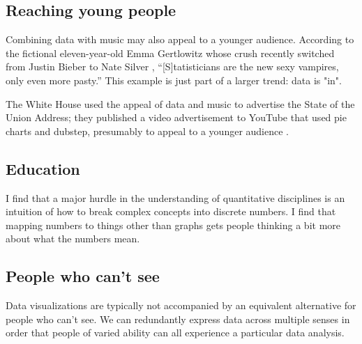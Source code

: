\documentclass{acm_proc_article-sp}
\begin{document}
\subsection{Reaching young people}
Combining data with music may also appeal to a younger audience.
According to the fictional eleven-year-old Emma Gertlowitz whose crush
recently switched from Justin Bieber to Nate Silver \cite{emma},
``[S]tatisticians are the new sexy vampires, only even more pasty.''
This example is just part of a larger trend: data is "in".

The White House used the appeal of data and music to advertise the State
of the Union Address; they published a video advertisement to YouTube that
used pie charts and dubstep, presumably to appeal to a younger audience \cite{whitehouse}.

\subsection{Education}
I find that a major hurdle in the understanding of quantitative disciplines
is an intuition of how to break complex concepts into discrete numbers.
I find that mapping numbers to things other than graphs gets people thinking
a bit more about what the numbers mean.

\subsection{People who can't see}
Data visualizations are typically not accompanied by an equivalent
alternative for people who can't see. We can redundantly express data
across multiple senses in order that people of varied ability can all
experience a particular data analysis.



\balancecolumns
\end{document}
